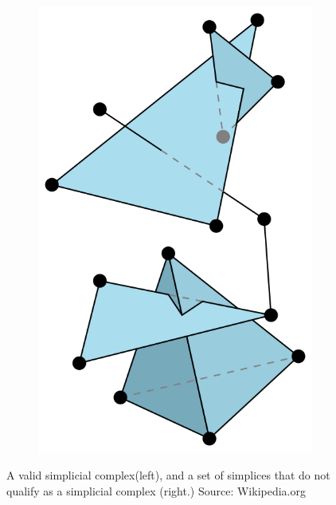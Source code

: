 \begin{figure}
\begin{subfigure}[b]{0.3\textwidth}
                \includegraphics[width=\textwidth]{img/wiki_nonsimplicialcomplex.png}
        \end{subfigure}

        \caption{A valid simplicial complex(left), and a set of simplices
                 that do not qualify as a simplicial complex (right.) Source:
                 Wikipedia.org \cite{wikisc}}
        \label{fig:scexamples}
\end{figure}


